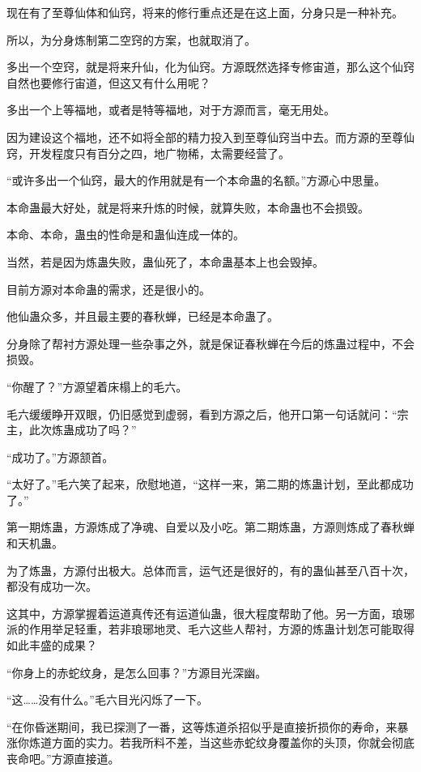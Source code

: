\begin{this_body}
现在有了至尊仙体和仙窍，将来的修行重点还是在这上面，分身只是一种补充。

所以，为分身炼制第二空窍的方案，也就取消了。

多出一个空窍，就是将来升仙，化为仙窍。方源既然选择专修宙道，那么这个仙窍自然也要修行宙道，但这又有什么用呢？

多出一个上等福地，或者是特等福地，对于方源而言，毫无用处。

因为建设这个福地，还不如将全部的精力投入到至尊仙窍当中去。而方源的至尊仙窍，开发程度只有百分之四，地广物稀，太需要经营了。

“或许多出一个仙窍，最大的作用就是有一个本命蛊的名额。”方源心中思量。

本命蛊最大好处，就是将来升炼的时候，就算失败，本命蛊也不会损毁。

本命、本命，蛊虫的性命是和蛊仙连成一体的。

当然，若是因为炼蛊失败，蛊仙死了，本命蛊基本上也会毁掉。

目前方源对本命蛊的需求，还是很小的。

他仙蛊众多，并且最主要的春秋蝉，已经是本命蛊了。

分身除了帮衬方源处理一些杂事之外，就是保证春秋蝉在今后的炼蛊过程中，不会损毁。

“你醒了？”方源望着床榻上的毛六。

毛六缓缓睁开双眼，仍旧感觉到虚弱，看到方源之后，他开口第一句话就问：“宗主，此次炼蛊成功了吗？”

“成功了。”方源颔首。

“太好了。”毛六笑了起来，欣慰地道，“这样一来，第二期的炼蛊计划，至此都成功了。”

第一期炼蛊，方源炼成了净魂、自爱以及小吃。第二期炼蛊，方源则炼成了春秋蝉和天机蛊。

为了炼蛊，方源付出极大。总体而言，运气还是很好的，有的蛊仙甚至八百十次，都没有成功一次。

这其中，方源掌握着运道真传还有运道仙蛊，很大程度帮助了他。另一方面，琅琊派的作用举足轻重，若非琅琊地灵、毛六这些人帮衬，方源的炼蛊计划怎可能取得如此丰盛的成果？

“你身上的赤蛇纹身，是怎么回事？”方源目光深幽。

“这……没有什么。”毛六目光闪烁了一下。

“在你昏迷期间，我已探测了一番，这等炼道杀招似乎是直接折损你的寿命，来暴涨你炼道方面的实力。若我所料不差，当这些赤蛇纹身覆盖你的头顶，你就会彻底丧命吧。”方源直接道。


\end{this_body}
